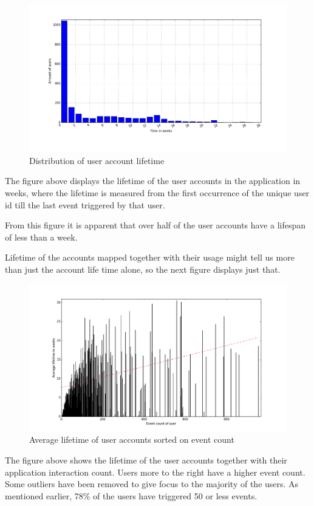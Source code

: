     \begin{figure}[H]
        \includegraphics[width=5in]{image/userTimespansdistribution.png}
        \centering
        \caption{Distribution of user account lifetime}
    \label{figure:userTimespandist}
    \end{figure}
        The figure above displays the lifetime of the user accounts in the application in weeks, where the lifetime is measured from the first occurrence of the unique user id till the last event triggered by that user.

        From this figure it is apparent that over half of the user accounts have a lifespan of less than a week.

        Lifetime of the accounts mapped together with their usage might tell us more than just the account life time alone, so the next figure displays just that.

    \begin{figure}[H]
        \includegraphics[width=5in]{image/avglifetimeoncountuser.png}
        \centering
        \caption{Average lifetime of user accounts sorted on event count}
    \label{figure:avglifetimeoncountuser}
    \end{figure}
        The figure above shows the lifetime of the user accounts together with their application interaction count.
        Users more to the right have a higher event count.
        Some outliers have been removed to give focus to the majority of the users. As mentioned earlier, 78\% of the users have triggered 50 or less events.

